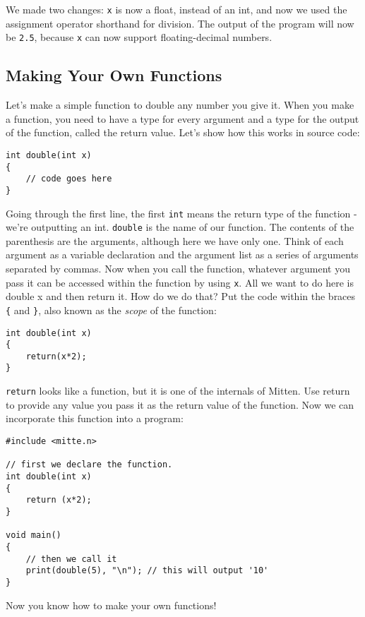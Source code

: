 \documentclass[10pt,a4paper]{article}
\begin{document}
We made two changes: \verb|x| is now a float, instead of an int, and now we used the assignment operator shorthand for division. The output of the program will now be \verb|2.5|, because \verb|x| can now support floating-decimal numbers. 

\newpage




\subsection{Making Your Own Functions}
Let's make a simple function to double any number you give it. When you make a function, you need to have a type for every argument and a type for the output of the function, called the return value. Let's show how this works in source code:
\begin{verbatim}
int double(int x)
{
    // code goes here
}
\end{verbatim}

Going through the first line, the first \verb|int| means the return type of the function - we're outputting an int. \verb|double| is the name of our function. The contents of the parenthesis are the arguments, although here we have only one. Think of each argument as a variable declaration and the argument list as a series of arguments separated by commas. Now when you call the function, whatever argument you pass it can be accessed within the function by using \verb|x|. All we want to do here is double x and then return it. How do we do that? Put the code within the braces \verb|{| and \verb|}|, also known as the \textit{scope} of the function:
\begin{verbatim}
int double(int x)
{
    return(x*2);
}
\end{verbatim}

\verb|return| looks like a function, but it is one of the internals of Mitten. Use return to provide any value you pass it as the return value of the function. Now we can incorporate this function into a program:
\begin{verbatim}
#include <mitte.n>

// first we declare the function.
int double(int x)
{
    return (x*2);
}

void main()
{
    // then we call it
    print(double(5), "\n"); // this will output '10'
}
\end{verbatim}

Now you know how to make your own functions!

\newpage
\end{document}
